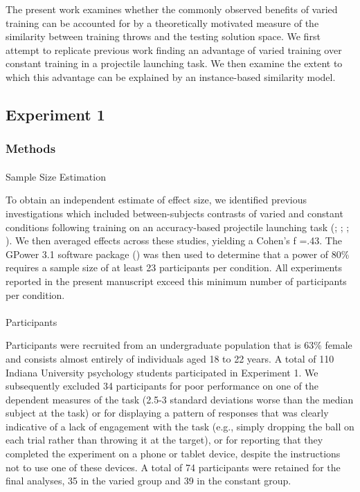 \documentclass[
  11pt,
  letterpaper,
]{article}
\makeatletter
\let\oldparagraph\paragraph
\renewcommand{\paragraph}{
    \@ifstar
      \xxxParagraphStar
      \xxxParagraphNoStar
  }
\newcommand{\xxxParagraphStar}[1]{\oldparagraph*{#1}\mbox{}}
\newcommand{\xxxParagraphNoStar}[1]{\oldparagraph{#1}\mbox{}}
\makeatother
\begin{document}
The present work examines whether the commonly observed benefits of
varied training can be accounted for by a theoretically motivated
measure of the similarity between training throws and the testing
solution space. We first attempt to replicate previous work finding an
advantage of varied training over constant training in a projectile
launching task. We then examine the extent to which this advantage can
be explained by an instance-based similarity model.

\subsection{Experiment 1}\label{experiment-1}

\subsubsection{Methods}\label{methods}

\paragraph{Sample Size Estimation}\label{sample-size-estimation}

To obtain an independent estimate of effect size, we identified previous
investigations which included between-subjects contrasts of varied and
constant conditions following training on an accuracy-based projectile
launching task (;
; ; ). We then
averaged effects across these studies, yielding a Cohen's f =.43. The
GPower 3.1 software package
() was
then used to determine that a power of 80\% requires a sample size of at
least 23 participants per condition. All experiments reported in the
present manuscript exceed this minimum number of participants per
condition.

\paragraph{Participants}\label{participants}

Participants were recruited from an undergraduate population that is
63\% female and consists almost entirely of individuals aged 18 to 22
years. A total of 110 Indiana University psychology students
participated in Experiment 1. We subsequently excluded 34 participants
for poor performance on one of the dependent measures of the task (2.5-3
standard deviations worse than the median subject at the task) or for
displaying a pattern of responses that was clearly indicative of a lack
of engagement with the task (e.g., simply dropping the ball on each
trial rather than throwing it at the target), or for reporting that they
completed the experiment on a phone or tablet device, despite the
instructions not to use one of these devices. A total of 74 participants
were retained for the final analyses, 35 in the varied group and 39 in
the constant group.
\end{document}
